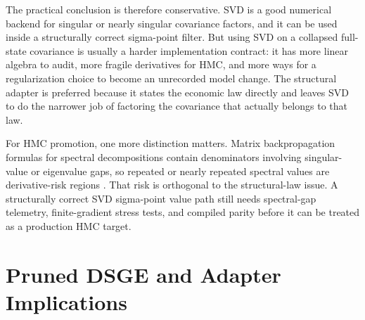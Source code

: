 The practical conclusion is therefore conservative.  SVD is a good numerical
backend for singular or nearly singular covariance factors, and it can be used
inside a structurally correct sigma-point filter.  But using SVD on a collapsed
full-state covariance is usually a harder implementation contract: it has more
linear algebra to audit, more fragile derivatives for HMC, and more ways for a
regularization choice to become an unrecorded model change.  The structural
adapter is preferred because it states the economic law directly and leaves SVD
to do the narrower job of factoring the covariance that actually belongs to
that law.

For HMC promotion, one more distinction matters.  Matrix backpropagation
formulas for spectral decompositions contain denominators involving
singular-value or eigenvalue gaps, so repeated or nearly repeated spectral
values are derivative-risk regions \citep{ionescu2015matrixbackprop}.  That
risk is orthogonal to the structural-law issue.  A structurally correct SVD
sigma-point value path still needs spectral-gap telemetry, finite-gradient
stress tests, and compiled parity before it can be treated as a production HMC
target.

\section{Pruned DSGE and Adapter Implications}
\label{sec:bf-pruned-dsge-correct-pattern}

